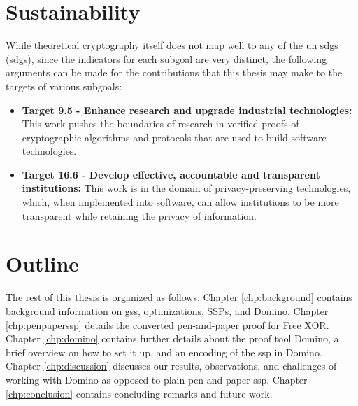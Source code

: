 \section{Sustainability}
\label{sec:sustainability}
While theoretical cryptography itself does not map well to any of the \acrfull{un} \acrlong{sdg}s (\acrshort{sdg}s), since the indicators for each subgoal are very distinct, the following arguments can be made for the contributions that this thesis may make to the targets of various subgoals:
\begin{itemize}
    \item \textbf{Target 9.5 - Enhance research and upgrade industrial technologies:} This work pushes the boundaries of research in verified proofs of cryptographic algorithms and protocols that are used to build software technologies.
    \item \textbf{Target 16.6 - Develop effective, accountable and transparent institutions:} This work is in the domain of privacy-preserving technologies, which, when implemented into software, can allow institutions to be more transparent while retaining the privacy of information. 
\end{itemize}   

\section{Outline}
The rest of this thesis is organized as follows: Chapter \ref{chp:background} contains background information on \acrlong{gs}s, optimizations, SSPs, and Domino. Chapter \ref{chp:penpaperssp} details the converted pen-and-paper proof for Free XOR. Chapter \ref{chp:domino} contains further details about the proof tool Domino, a brief overview on how to set it up, and an encoding of the \acrlong{ssp} in Domino. Chapter \ref{chp:discussion} discusses our results, observations, and challenges of working with Domino as opposed to plain pen-and-paper \acrshort{ssp}. Chapter \ref{chp:conclusion} contains concluding remarks and future work. 
